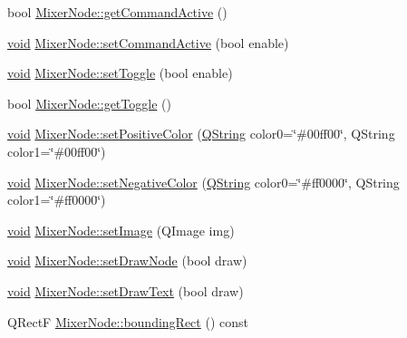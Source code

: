 \begin{DoxyCompactItemize}
\item 
bool \hyperlink{group___u_a_v_object_widget_utils_ga63b0822569ce8326323c15159682c57e}{\-Mixer\-Node\-::get\-Command\-Active} ()
\item 
\hyperlink{group___u_a_v_objects_plugin_ga444cf2ff3f0ecbe028adce838d373f5c}{void} \hyperlink{group___u_a_v_object_widget_utils_ga224ddcb050b9008c2352ca9c1318159d}{\-Mixer\-Node\-::set\-Command\-Active} (bool enable)
\item 
\hyperlink{group___u_a_v_objects_plugin_ga444cf2ff3f0ecbe028adce838d373f5c}{void} \hyperlink{group___u_a_v_object_widget_utils_ga55f38aaacbac71e094d96baf3df429a4}{\-Mixer\-Node\-::set\-Toggle} (bool enable)
\item 
bool \hyperlink{group___u_a_v_object_widget_utils_gab63ea3448c47f2e65a056ec49b30e0d1}{\-Mixer\-Node\-::get\-Toggle} ()
\item 
\hyperlink{group___u_a_v_objects_plugin_ga444cf2ff3f0ecbe028adce838d373f5c}{void} \hyperlink{group___u_a_v_object_widget_utils_ga1318ec003e5b6d72bb03b061f6df3996}{\-Mixer\-Node\-::set\-Positive\-Color} (\hyperlink{group___u_a_v_objects_plugin_gab9d252f49c333c94a72f97ce3105a32d}{\-Q\-String} color0=\char`\"{}\#00ff00\char`\"{}, Q\-String color1=\char`\"{}\#00ff00\char`\"{})
\item 
\hyperlink{group___u_a_v_objects_plugin_ga444cf2ff3f0ecbe028adce838d373f5c}{void} \hyperlink{group___u_a_v_object_widget_utils_gaa22c8cab4fa7424caf1a9168f12365e3}{\-Mixer\-Node\-::set\-Negative\-Color} (\hyperlink{group___u_a_v_objects_plugin_gab9d252f49c333c94a72f97ce3105a32d}{\-Q\-String} color0=\char`\"{}\#ff0000\char`\"{}, \-Q\-String color1=\char`\"{}\#ff0000\char`\"{})
\item 
\hyperlink{group___u_a_v_objects_plugin_ga444cf2ff3f0ecbe028adce838d373f5c}{void} \hyperlink{group___u_a_v_object_widget_utils_ga85ed2c5bf8ae66f16496bd5fef25362b}{\-Mixer\-Node\-::set\-Image} (\-Q\-Image img)
\item 
\hyperlink{group___u_a_v_objects_plugin_ga444cf2ff3f0ecbe028adce838d373f5c}{void} \hyperlink{group___u_a_v_object_widget_utils_ga90b5c3c03fb1cca75ba471125d93b550}{\-Mixer\-Node\-::set\-Draw\-Node} (bool draw)
\item 
\hyperlink{group___u_a_v_objects_plugin_ga444cf2ff3f0ecbe028adce838d373f5c}{void} \hyperlink{group___u_a_v_object_widget_utils_gac7a63c8df4268991b6c48f6d528fe02c}{\-Mixer\-Node\-::set\-Draw\-Text} (bool draw)
\item 
\-Q\-Rect\-F \hyperlink{group___u_a_v_object_widget_utils_ga016954be92f06c8ef2007526890e030e}{\-Mixer\-Node\-::bounding\-Rect} () const 

\end{DoxyCompactItemize}
